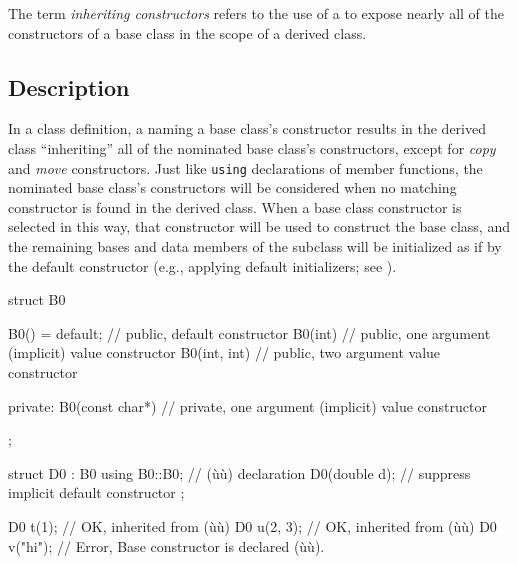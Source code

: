 
\label{inheriting-constructors}
\setcounter{table}{0}
\setcounter{footnote}{0}
\setcounter{lstlisting}{0}



The term \emph{inheriting constructors} refers to the use of a
 to expose nearly all of the
constructors of a base class in the scope of a derived class.

\subsection[Description]{Description}\label{description-inheritingctor}

In a class definition, a  naming a
base class's constructor results in the derived class ``inheriting'' all
of the nominated base class's constructors, except for \emph{copy} and
\emph{move} constructors. Just like \lstinline!using! declarations of member functions, the nominated base class's
constructors will be considered when no matching constructor is found in
the derived class. When a base class constructor is selected in this way,
that constructor will be used to construct the base class, and the
remaining bases and data members of the subclass will be initialized as
if by the default constructor (e.g., applying default initializers;
see ).

\begin{emcppslisting}[emcppsbatch=e1]
struct B0
{
    B0() = default;      // public, default constructor
    B0(int)         { }  // public, one argument (implicit) value constructor
    B0(int, int)    { }  // public, two argument value constructor

private:
    B0(const char*) { }  // private, one argument (implicit) value constructor
};

struct D0 : B0
{
    using B0::B0;  // (ù{}ù) declaration
    D0(double d);  // suppress implicit default constructor
};

D0 t(1);     // OK, inherited from (ù{}ù)
D0 u(2, 3);  // OK, inherited from (ù{}ù)
D0 v("hi");  // Error, Base constructor is declared (ù{}ù).
\end{emcppslisting}

